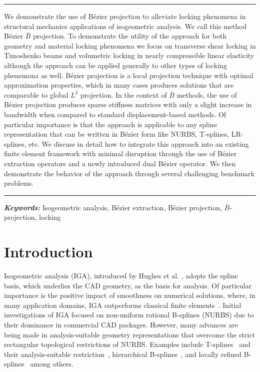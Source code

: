 \documentclass{article}
\newcommand{\Bezier}{{B\'{e}zier} }
\renewenvironment{abstract}{%
\hfill\begin{minipage}{0.95\textwidth}
\rule{\textwidth}{1pt}}
{\par\noindent\rule{\textwidth}{1pt}\end{minipage}}
\providecommand{\keywords}[1]{\textbf{\textit{Keywords: }}#1}
\begin{document}
\begin{abstract}
  We demonstrate the use of B\'{e}zier projection to alleviate locking phenomena in structural mechanics applications of isogeometric analysis. We call this method B\'{e}zier $\bar{B}$ projection. To demonstrate the utility of the approach for both geometry and material locking phenomena we focus on transverse shear locking in Timoshenko beams and volumetric locking in nearly compressible linear elasticity although the approach can be applied generally to other types of locking phenemona as well. B\'{e}zier projection is a local projection technique with optimal approximation properties, which in many cases produces solutions that are comparable to global $L^2$ projection. In the context of $\bar{B}$ methods, the use of B\'ezier projection produces sparse stiffness matrices with only a slight increase in bandwidth when compared to standard displacement-based methods. Of particular importance is that the approach is applicable to any spline representation that can be written in B\'ezier form like NURBS, T-splines, LR-splines, etc. We discuss in detail how to integrate this approach into an existing finite element framework with minimal disruption through the use of B\'ezier extraction operators and a newly introduced dual  \Bezier {} operator. We then demonstrate the behavior of the approach through several challenging benchmark problems.
\end{abstract}
\keywords{Isogeometric analysis, B\'ezier extraction, B\'ezier projection, $\bar{B}$-projection, locking}
\section{Introduction}
Isogeometric analysis (IGA), introduced by Hughes et al. \cite{hughes_isogeometric_2005}, adopts the spline basis, which underlies the CAD geometry, as the basis for analysis. Of particular importance is the positive impact of smoothness on numerical solutions, where, in many application domains, IGA outperforms classical finite elements~\cite{cottrell_isogeometric_2009,cottrell_studies_2007,cottrell2006isogeometric,hughes_duality_2008,bazilevs_isogeometric_2010,evans_n-widths_2009}. Initial investigations of IGA focused on non-uniform rational B-splines (NURBS) due to their dominance in commercial CAD packages. However, many advances are being made in analysis-suitable geometry representations that overcome the strict rectangular topological restrictions of NURBS. Examples include T-splines~\cite{bazilevs_isogeometric_2010,sederberg_t-splines_2003} and their analysis-suitable restriction~\cite{scott_local_2012, li_analysis-suitable_2013}, hierarchical B-splines~\cite{bornemann_subdivision-based_2013,scott_isogeometric_2014,schillinger_isogeometric_2012,evans_hierarchical_2015,forsey_hierarchical_1988}, and locally refined B-splines~\cite{dokken_polynomial_2013,johannessen_isogeometric_2014} among others.
\end{document}
